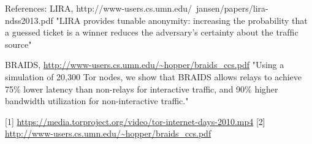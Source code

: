 \documentclass[letterpaper]{article}
\begin{document}
References:
LIRA, http://www-users.cs.umn.edu/~jansen/papers/lira-ndss2013.pdf
"LIRA provides tunable anonymity: increasing the probability that a guessed
ticket is a winner reduces the adversary’s certainty about the
trafﬁc source"

BRAIDS, \url{http://www-users.cs.umn.edu/~hopper/braids_ccs.pdf}
"Using a simulation of 20,300 Tor nodes, we show that BRAIDS allows relays to achieve
75\% lower latency than non-relays for interactive traffic, and 90\%
higher bandwidth utilization for non-interactive traffic."


[1] \url{https://media.torproject.org/video/tor-internet-days-2010.mp4}
[2] \url{http://www-users.cs.umn.edu/~hopper/braids_ccs.pdf}



%
%
\end{document}
